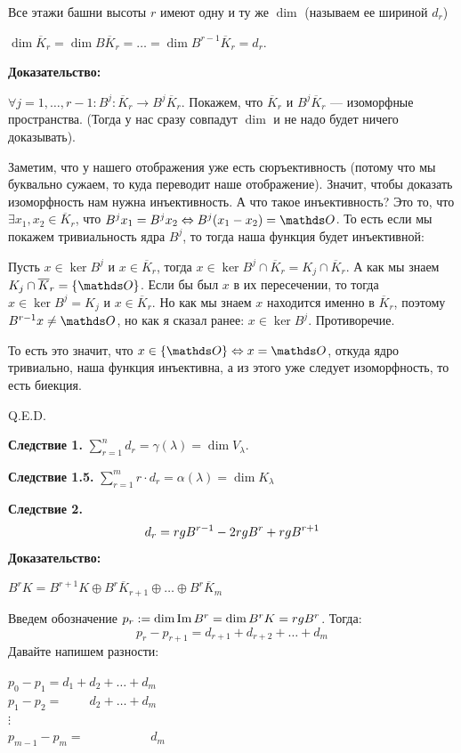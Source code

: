 Все этажи башни высоты $r$ имеют одну и ту же $\dim$ (называем ее шириной $d_r$)

$\dim \overline{K}_r = \dim B \overline{K}_r = \ldots = \dim B^{r-1}\overline{K}_r = d_r$.

\textbf{Доказательство:}

$\forall j=1,\ldots,r-1:B^j: \overline{K}_r \rightarrow B^j\overline{K}_r$. Покажем, что $\overline{K}_r $ и $B^j\overline{K}_r$ --- изоморфные пространства. (Тогда у нас сразу совпадут $\dim$ и не надо будет ничего доказывать).

Заметим, что у нашего отображения уже есть сюръективность (потому что мы буквально сужаем, то куда переводит наше отображение). Значит, чтобы доказать изоморфность нам нужна инъективность. А что такое инъективность? Это то, что $\exists x_1,x_2 \in \overline{K}_r$, что $B^jx_1=B^jx_2 \Leftrightarrow B^j(x_1-x_2)=\zero$. То есть если мы покажем тривиальность ядра $B^j$, то тогда наша функция будет инъективной:

Пусть $x \in \ker B^j$ и $x\in \overline{K}_r$, тогда $x\in \ker B^j \cap \overline{K}_r = K_j \cap \overline{K}_r$. А как мы знаем $ K_j \cap \overline{K}_r = \{\zero\}$. Если бы был $x$ в их пересечении, то тогда $x \in \ker B^j =K_j$ и $x \in \overline{K}_{r}$. Но как мы знаем $x$ находится именно в $\overline{K}_r$, поэтому $B^{r-1}x \neq \zero$, но как я сказал ранее:  $x \in \ker B^j $. Противоречие.

То есть это значит, что $x \in \{\zero\} \Leftrightarrow x =\zero$, откуда ядро тривиально, наша функция инъективна, а из этого уже следует изоморфность, то есть биекция.

\hfill Q.E.D.

\textbf{Следствие 1.} $\sum\limits_{r=1}^nd_r = \gamma(\lambda) = \dim V_{\lambda}$.

\textbf{Следствие 1.5.} $\sum\limits_{r=1}^m r \cdot d_r = \alpha(\lambda)= \dim K_{\lambda}$

\textbf{Следствие 2.} 
$$d_r = rg B^{r-1}-2 rg B^r + rg B^{r+1}$$
\textbf{Доказательство:}

$B^rK = B^{r+1}K \oplus B^r\overline{K}_{r+1}\oplus\ldots\oplus B^r \overline{K}_m$

Введем обозначение $p_r:=\dim \operatorname{Im} B^r = \dim B^rK = rg B^r$. Тогда:
$$p_r - p_{r+1} = d_{r+1}+d_{r+2}+\ldots +d_m$$ 
Давайте напишем разности:

$p_0-p_1 = d_1 + d_2 +\ldots + d_m$\\
$p_1-p_2 = \quad\quad\, d_2 + \ldots + d_m$\\
$\vdots$\\
$p_{m-1}-p_m = \quad\quad\quad\quad \quad \,\,d_m$

